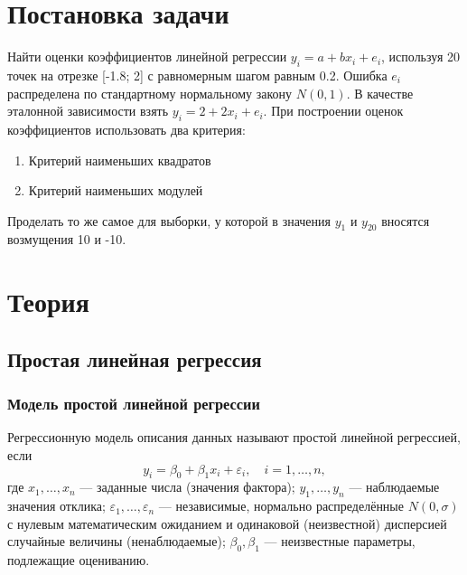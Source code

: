 \documentclass[12pt]{article}
\begin{document}
\begin{flushleft}

\setlength{\parindent}{1cm}

\tableofcontents

\newpage

\listoffigures

\newpage

\section{Постановка задачи}
Найти оценки коэффициентов линейной регрессии $y_i = a + bx_i + e_i$, используя 20 точек на отрезке [-1.8; 2] с равномерным шагом равным 0.2.
Ошибка $e_i$ распределена по стандартному нормальному закону $N(0, 1)$.
В качестве эталонной зависимости взять $y_i = 2 + 2x_i + e_i$.
При построении оценок коэффициентов использовать два критерия: 

\begin{enumerate}
	\item Критерий наименьших квадратов
	\item Критерий наименьших модулей
\end{enumerate}
Проделать то же самое для выборки, у которой в значения $y_1$ и $y_{20}$ вносятся возмущения 10 и -10.

\newpage

\section{Теория}

\subsection{Простая линейная регрессия}

    \subsubsection{Модель простой линейной регрессии}
    Регрессионную модель описания данных называют простой линейной регрессией, если
    \begin{equation}
        y_i = \beta_0 + \beta_1x_i + \varepsilon_i, \quad i=1, \dots, n,
    \end{equation}
    где $x_1, \dots, x_n$ — заданные числа (значения фактора); $y_1, \dots, y_n$ — наблюдаемые значения отклика; $\varepsilon_1, \dots, \varepsilon_n$ — независимые, нормально распределённые $N(0,\sigma)$ с нулевым математическим ожиданием и одинаковой (неизвестной) дисперсией случайные величины (ненаблюдаемые); $\beta_0, \beta_1$ — неизвестные параметры, подлежащие оцениванию.


\end{flushleft}
\end{document}
